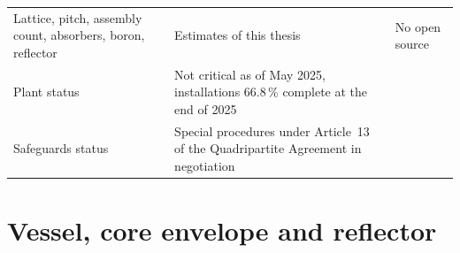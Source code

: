\begin{table}[htbp]
\begin{tabularx}{\textwidth}{@{}>{\raggedright\arraybackslash}p{3.2cm} >{\raggedright\arraybackslash}p{3.8cm} >{\raggedright\arraybackslash}X@{}}
    Lattice, pitch, assembly count, absorbers, boron, reflector & Estimates of this thesis & No open source \\
    Plant status & Not critical as of May 2025, installations 66.8\,\% complete at the end of 2025 & \cite{vasconcelos_fapesp_2025,marinha_relatorio_gestao_2025} \\
    Safeguards status & Special procedures under Article~13 of the Quadripartite Agreement in negotiation & \cite{iaea_dg_statement_2022,eu_statement_bog_2025,brazil_npt_wp13_2026} \\
    \bottomrule
  \end{tabularx}
\end{table}


\section{Vessel, core envelope and reflector}
\label{app:inputs-vessel}

